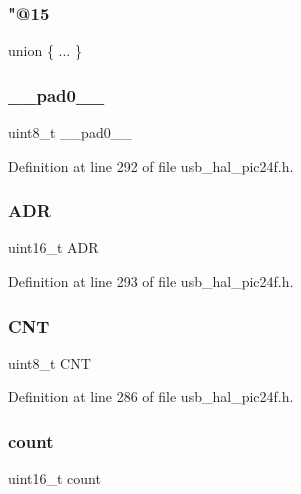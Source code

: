 \subsubsection{\texorpdfstring{"@15}{@15}}
{\footnotesize\ttfamily union \{ ... \} }

\mbox{\label{union_____b_d_t_a8b4eebe79ded0459acec2f4950102ba3}} 
\subsubsection{\texorpdfstring{\_\_pad0\_\_}{\_\_pad0\_\_}}
{\footnotesize\ttfamily uint8\+\_\+t \+\_\+\+\_\+pad0\+\_\+\+\_\+}



Definition at line 292 of file usb\+\_\+hal\+\_\+pic24f.\+h.

\mbox{\label{union_____b_d_t_abb5ea3cb20903a76af1e03bb35b36d29}} 
\subsubsection{\texorpdfstring{ADR}{ADR}}
{\footnotesize\ttfamily uint16\+\_\+t A\+DR}



Definition at line 293 of file usb\+\_\+hal\+\_\+pic24f.\+h.

\mbox{\label{union_____b_d_t_a8dcbbc96a681e9aec7bcee3ba3a93254}} 
\subsubsection{\texorpdfstring{CNT}{CNT}}
{\footnotesize\ttfamily uint8\+\_\+t C\+NT}



Definition at line 286 of file usb\+\_\+hal\+\_\+pic24f.\+h.

\mbox{\label{union_____b_d_t_af6a39bfc7e1dc3b6f9c997c1c43fa996}} 
\subsubsection{\texorpdfstring{count}{count}}
{\footnotesize\ttfamily uint16\+\_\+t count}



